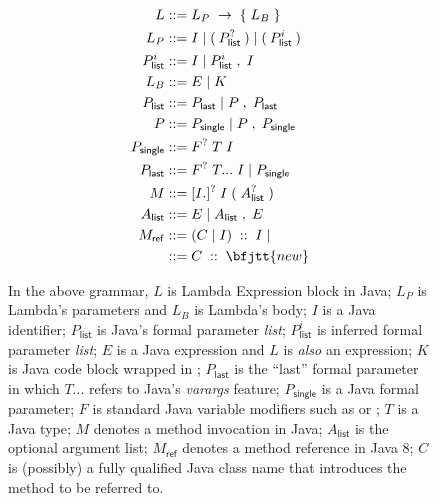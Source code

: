 \begin{figure}[t]
\begin{align}
L ::=& \; L_P \; \to \; \{ \; L_B \; \} \\
L_P ::=& \; I \; | \; ( \: P_{\mathsf{list}}^? \: ) \; | \; ( \: P_{\mathsf{list}}^i \: ) \\
P_{\mathsf{list}}^i ::=& \; I \; | \; P_{\mathsf{list}}^i \; , \; I \\
L_B ::=& \; E \; | \; K \\
P_{\mathsf{list}} ::=& \; P_{\mathsf{last}} \; | \; P \; , \; P_{\mathsf{last}} \\
P ::=& \; P_{\mathsf{single}} \; | \; P \; , \; P_{\mathsf{single}} \\
P_{\mathsf{single}} ::=& \; F^? \; T \; I \\
P_{\mathsf{last}} ::=& \; F^? \; T... \; I \; | \; P_{\mathsf{single}} \\
M ::=& \; [I.]^? \; I \; ( \; A_{\mathsf{list}}^? \; )  \\
A_{\mathsf{list}} ::=& \; E \; | \; A_{\mathsf{list}} \; , \; E \\
M_{\mathsf{ref}} ::=& \; (C \; | \; I) \; :: \; I \; | \\
                 ::=& \; C \; :: \; \bfjtt{new}
\end{align} 
\caption{
In the above grammar, $L$ is Lambda Expression block in Java; 
$L_P$ is Lambda's parameters and $L_B$ is Lambda's body; 
$I$ is a Java identifier;
$P_{\mathsf{list}}$ is Java's formal parameter \emph{list};
$P_{\mathsf{list}}^i$ is inferred formal parameter \emph{list};
$E$ is a Java expression and $L$ is \emph{also} an expression;
$K$ is Java code block wrapped in \jtt{\{\}};
$P_{\mathsf{last}}$ is the ``last'' formal parameter in which $T...$ refers to Java's \emph{varargs} feature;
$P_{\mathsf{single}}$ is a Java formal parameter;
$F$ is standard Java variable modifiers such as  or ;
$T$ is a Java type;
$M$ denotes a method invocation in Java;
$A_{\mathsf{list}}$ is the optional argument list;
$M_{\mathsf{ref}}$ denotes a method reference in Java 8;
$C$ is (possibly) a fully qualified Java class name that introduces the method to be referred to.
}
\label{fig:java8:syntax}
\end{figure}
